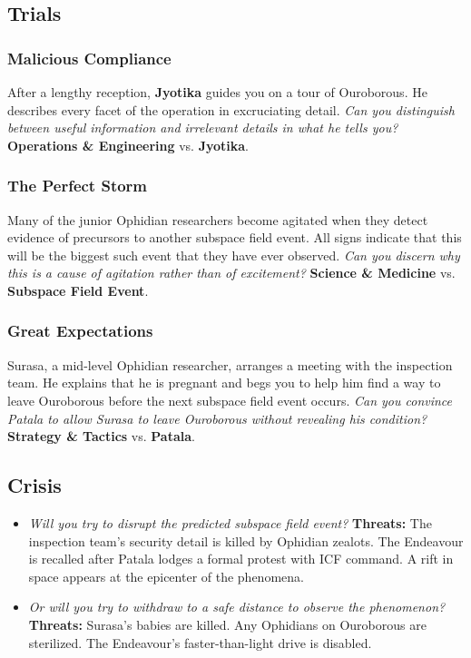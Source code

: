 \documentclass[11pt, a5paper, parskip=half-, DIV=12]{scrartcl}
\begin{document}
\newpage

\subsection*{Trials}
\subsubsection*{Malicious Compliance}
After a lengthy reception, \textbf{Jyotika} guides you on a tour of Ouroborous. He describes every facet of the operation in excruciating detail. \textit{Can you distinguish between useful information and irrelevant details in what he tells you?} \textbf{Operations \& Engineering} vs. \textbf{Jyotika}.

\subsubsection*{The Perfect Storm}
Many of the junior Ophidian researchers become agitated when they detect evidence of precursors to another subspace field event. All signs indicate that this will be the biggest such event that they have ever observed. \textit{Can you discern why this is a cause of agitation rather than of excitement?} \textbf{Science \& Medicine} vs. \textbf{Subspace Field Event}.

\subsubsection*{Great Expectations}
Surasa, a mid-level Ophidian researcher, arranges a meeting with the inspection team. He explains that he is pregnant and begs you to help him find a way to leave Ouroborous before the next subspace field event occurs. \textit{Can you convince Patala to allow Surasa to leave Ouroborous without revealing his condition?} \textbf{Strategy \& Tactics} vs. \textbf{Patala}.

\subsection*{Crisis}

\begin{itemize}
	\item \textit{Will you try to disrupt the predicted subspace field event?} \textbf{Threats:} The inspection team's security detail is killed by Ophidian zealots. The Endeavour is recalled after Patala lodges a formal protest with ICF command. A rift in space appears at the epicenter of the phenomena.
	\item \textit{Or will you try to withdraw to a safe distance to observe the phenomenon?} \textbf{Threats:} Surasa's babies are killed. Any Ophidians on Ouroborous are sterilized.  The Endeavour's faster-than-light drive is disabled. 
\end{itemize}
\end{document}
